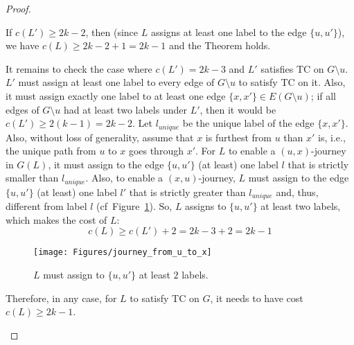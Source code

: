\documentclass[a4paper,UKenglish]{article}
\begin{document}
\begin{proof}
\begin{enumerate}[label=(\alph*)]
\begin{description}
If $c(L')\geq 2k-2$, then (since $L$ assigns at least one label to the edge $\{u,u'\}$), we have $c(L)\geq 2k-2 +1 = 2k-1$ and the Theorem holds.

It remains to check the case where $c(L')=2k-3$ and $L'$ satisfies TC on $G\setminus u$. $L'$ must assign at least one label to every edge of $G\setminus u$ to satisfy TC on it. Also, it must assign exactly one label to at least one edge $\{x,x'\} \in E(G\setminus u)$; if all edges of $G\setminus u$ had at least two labels under $L'$, then it would be $c(L') \geq 2(k-1)=2k-2$. Let $l_{unique}$ be the unique label of the edge $\{x,x'\}$. Also, without loss of generality, assume that $x$ is furthest from $u$ than $x'$ is, i.e., the unique path from $u$ to $x$ goes through $x'$. For $L$ to enable a $(u,x)$-journey in $G(L)$, it must assign to the edge $\{u,u'\}$ (at least) one label $l$ that is strictly smaller than $l_{unique}$. Also, to enable a $(x,u)$-journey, $L$ must assign to the edge $\{u,u'\}$ (at least) one label $l'$ that is strictly greater than $l_{unique}$ and, thus, different from label $l$ (cf~Figure~\ref{fig:journey_from_u_to_x}). So, $L$ assigns to $\{u,u'\}$ at least two labels, which makes the cost of $L$:
\[c(L) \geq c(L') +2 = 2k-3+2 = 2k-1\]

\begin{figure}[!htb]
\centering
\texttt{[image: Figures/journey\_from\_u\_to\_x]}
\caption{$L$ must assign to $\{u,u'\}$ at least $2$ labels.}
\label{fig:journey_from_u_to_x}
\end{figure}

Therefore, in any case, for $L$ to satisfy TC on $G$, it needs to have cost $c(L) \geq 2k -1$.
\end{description}










\end{enumerate}
\end{proof}
\end{document}

